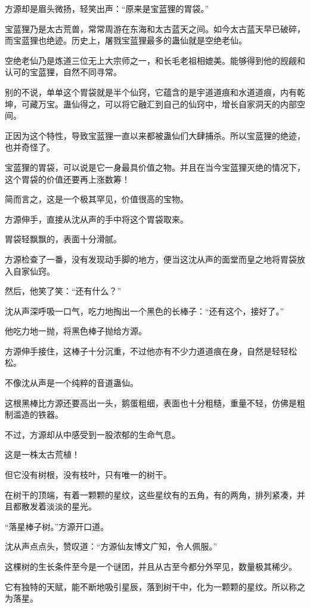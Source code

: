 \begin{this_body}
方源却是眉头微扬，轻笑出声：“原来是宝蓝狸的胃袋。”

宝蓝狸乃是太古荒兽，常常周游在东海和太古蓝天之间。如今太古蓝天早已破碎，而宝蓝狸也绝迹。历史上，屠戮宝蓝狸最多的蛊仙就是空绝老仙。

空绝老仙乃是炼道三位无上大宗师之一，和长毛老祖相媲美。能够得到他的觊觎和认可的宝蓝狸，自然不同寻常。

别的不说，单单这个胃袋就是半个仙窍，它蕴含的是宇道道痕和水道道痕，内有乾坤，可藏万宝。蛊仙得之，可以将它融汇到自己的仙窍中，增长自家洞天的内部空间。

正因为这个特性，导致宝蓝狸一直以来都被蛊仙们大肆捕杀。所以宝蓝狸的绝迹，也并奇怪了。

宝蓝狸的胃袋，可以说是它一身最具价值之物。并且在当今宝蓝狸灭绝的情况下，这个胃袋的价值还要再上涨数筹！

简而言之，这是一个极其罕见，价值很高的宝物。

方源伸手，直接从沈从声的手中将这个胃袋取来。

胃袋轻飘飘的，表面十分滑腻。

方源检查了一番，没有发现动手脚的地方，便当这沈从声的面堂而皇之地将胃袋放入自家仙窍。

然后，他笑了笑：“还有什么？”

沈从声深呼吸一口气，吃力地掏出一个黑色的长棒子：“还有这个，接好了。”

他吃力地一抛，将黑色棒子抛给方源。

方源伸手接住，这棒子十分沉重，不过他亦有不少力道道痕在身，自然是轻轻松松。

不像沈从声是一个纯粹的音道蛊仙。

这根黑棒比方源还要高出一头，鹅蛋粗细，表面也十分粗糙，重量不轻，仿佛是粗制滥造的铁器。

不过，方源却从中感受到一股浓郁的生命气息。

这是一株太古荒植！

但它没有树根，没有枝叶，只有唯一的树干。

在树干的顶端，有着一颗颗的星纹，这些星纹有的五角，有的两角，排列紧凑，并且都散发着淡淡的星光。

“落星棒子树。”方源开口道。

沈从声点点头，赞叹道：“方源仙友博文广知，令人佩服。”

这棵树的生长条件至今是一个谜团，并且从古至今都分外罕见，数量极其稀少。

它有独特的天赋，能不断地吸引星辰，落到树干中，化为一颗颗的星纹。所以称之为落星。


\end{this_body}
